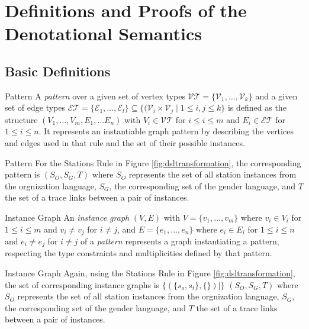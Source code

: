 \section{Definitions and Proofs of the Denotational Semantics}
\label{sec:proofs_denotation}

\subsection{Basic Definitions}

\begin{definition}{Pattern}
\label{def:rule_pattern}
A \emph{pattern} over a given set of vertex types $\mathcal{VT} = \{ \mathcal{V}_1,\dots,\mathcal{V}_k\}$ and a given set of edge types $\mathcal{ET} = \{ \mathcal{E}_1, \dots,\mathcal{E}_l \} \subseteq \{ (\mathcal{V}_i \times \mathcal{V}_j \mid 1 \leq i,j \leq k \}$ is defined as the structure $(V_1,\dots,V_m,E_1,\dots E_n)$ with $V_i \in \mathcal{VT}$ for $i \leq i \leq m$ and $E_i \in \mathcal{ET}$ for $1 \leq i \leq n$. It represents an instantiable graph pattern by describing the vertices and edges used in that rule and the set of their possible instances.
\end{definition}

\begin{example}{Pattern}
For the Stations Rule in Figure \ref{fig:dsltransformation}, the corresponding pattern is
$(S_O,S_G,T)$ where $S_O$ represents the set of all station instances from the orgnization language, $S_G$, the corresponding set of the gender language, and $T$ the set of a trace links between a pair of instances.
\end{example}

\begin{definition}{Instance Graph}
\label{def:instance_graph}
An \emph{instance graph} $(V,E)$ with $V = \{ v_1,\dots,v_m \}$ where $v_i \in V_i$ for $1 \leq i \leq m$ and $v_i \neq v_j$ for $i \neq j$, and $E = \{ e_1,\dots, e_n \}$ where $e_i \in E_i$ for $1 \leq i \leq n$ and $e_i \neq e_j$ for $i \neq j$ of a \emph{pattern} represents a graph instantiating a pattern, respecting the type constraints and multiplicities defined by that pattern.
\end{definition}

\begin{example}{Instance Graph}
Again, using the Stations Rule in Figure \ref{fig:dsltransformation}, the set of corresponding instance graphs is $\{ ( \{ s_o, s_t \} , \{  \} ) \mid \}$
$(S_O,S_G,T)$ where $S_O$ represents the set of all station instances from the orgnization language, $S_G$, the corresponding set of the gender language, and $T$ the set of a trace links between a pair of instances.
\end{example}

